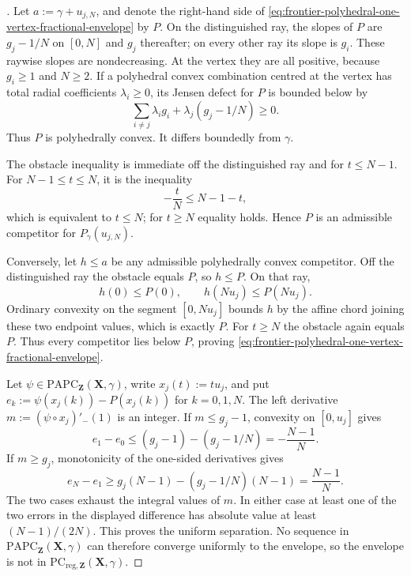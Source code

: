 
\begin{proof}[]
Let $a:=\gamma+u_{j,N}$, and denote the right-hand side of
\eqref{eq:frontier-polyhedral-one-vertex-fractional-envelope} by $P$.  On
the distinguished ray, the slopes of $P$ are $g_j-1/N$ on $[0,N]$ and
$g_j$ thereafter; on every other ray its slope is $g_i$.  These raywise
slopes are nondecreasing.  At the vertex they are all positive, because
$g_i\geq1$ and $N\geq2$.  If a polyhedral convex combination centred at the
vertex has total radial coefficients $\lambda_i\geq0$, its Jensen defect for
$P$ is bounded below by
\[
              \sum_{i\neq j}\lambda_i g_i
              +\lambda_j(g_j-1/N)\geq0.
\]
Thus $P$ is polyhedrally convex.  It differs boundedly from $\gamma$.

The obstacle inequality is immediate off the distinguished ray and for
$t\leq N-1$.  For $N-1\leq t\leq N$, it is the inequality
\[
                  -\frac{t}{N}\leq N-1-t,
\]
which is equivalent to $t\leq N$; for $t\geq N$ equality holds.  Hence $P$
is an admissible competitor for $P_\gamma(u_{j,N})$.

Conversely, let $h\leq a$ be any admissible polyhedrally convex competitor.
Off the distinguished ray the obstacle equals $P$, so $h\leq P$.  On that
ray,
\[
                   h(0)\leq P(0),\qquad
                   h(Nu_j)\leq P(Nu_j).
\]
Ordinary convexity on the segment $[0,Nu_j]$ bounds $h$ by the affine chord
joining these two endpoint values, which is exactly $P$.  For $t\geq N$ the
obstacle again equals $P$.  Thus every competitor lies below $P$, proving
\eqref{eq:frontier-polyhedral-one-vertex-fractional-envelope}.

Let $\psi\in\mathrm{PAPC}_{\mathbf Z}(\mathbf X,\gamma)$, write
$x_j(t):=tu_j$, and put
$e_k:=\psi(x_j(k))-P(x_j(k))$ for $k=0,1,N$.  The left derivative
$m:=(\psi\circ x_j)'_{-}(1)$ is an integer.  If
$m\leq g_j-1$, convexity on $[0,u_j]$ gives
\[
 e_1-e_0
 \leq(g_j-1)-(g_j-1/N)
 =-\frac{N-1}{N}.
\]
If $m\geq g_j$, monotonicity of the one-sided derivatives gives
\[
 e_N-e_1
 \geq g_j(N-1)-(g_j-1/N)(N-1)
 =\frac{N-1}{N}.
\]
The two cases exhaust the integral values of $m$.  In either case at least
one of the two errors in the displayed difference has absolute value at
least $(N-1)/(2N)$.  This proves the uniform separation.  No sequence in
$\mathrm{PAPC}_{\mathbf Z}(\mathbf X,\gamma)$ can therefore converge
uniformly to the envelope, so the envelope is not in
$\mathrm{PC}_{\mathrm{reg},\mathbf Z}(\mathbf X,\gamma)$.
\end{proof}

